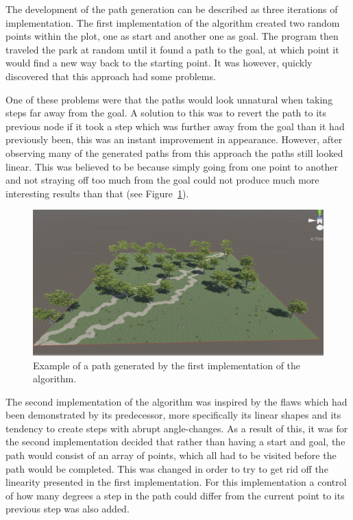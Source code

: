 The development of the path generation can be described as three iterations of implementation.
The first implementation of the algorithm created two random points within the plot, one as start and another one as goal. 
The program then traveled the park at random until it found a path to the goal, at which point it would find a new way back to the starting point. 
It was however, quickly discovered that this approach had some problems.
 
One of these problems were that the paths would look unnatural when taking steps far away from the goal. 
A solution to this was to revert the path to its previous node if it took a step which was further away from the goal than it had previously been, this was an instant improvement in appearance. 
However, after observing many of the generated paths from this approach the paths still looked linear. 
This was believed to be because simply going from one point to another and not straying off too much from the goal could not produce much more interesting results than that (see Figure~\ref{fig:linear}).
\begin{figure}[H]
  \centering
  \includegraphics[width=0.85\linewidth]{figure/linear.png}
  \caption{Example of a path generated by the first implementation of the algorithm.}
  \label{fig:linear}
\end{figure}
The second implementation of the algorithm was inspired by the flaws which had been demonstrated by its predecessor, more specifically its linear shapes and its tendency to create steps with abrupt angle-changes.
As a result of this, it was for the second implementation decided that rather than having a start and goal, the path would consist of an array of points, which all had to be visited before the path would be completed.
This was changed in order to try to get rid off the linearity presented in the first implementation.
For this implementation a control of how many degrees a step in the path could differ from the current point to its previous step was also added.
